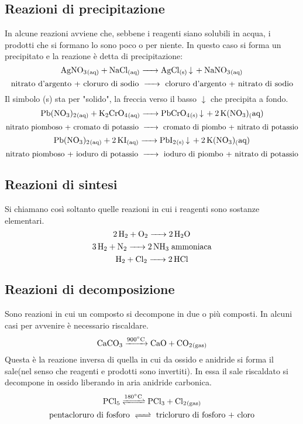 \subsection{Reazioni di precipitazione}
In alcune reazioni avviene che, sebbene i reagenti siano solubili in acqua, i prodotti che si formano lo sono poco o per niente. In questo caso si forma un precipitato e la reazione è detta di precipitazione:
$$\ce{ AgNO_3_{(aq)} + NaCl_{(aq)} -> AgCl_{(s)} v  + NaNO_3_{(aq)} }$$
$$\text{nitrato d'argento + cloruro di sodio \ce{->} cloruro d'argento + nitrato di sodio}$$
Il simbolo (s) sta per "solido", la freccia verso il basso $\downarrow$ che precipita a fondo.
$$\ce{Pb(NO_3)_2_{(aq)} + K_2CrO_4_{(aq)} ->  PbCrO_4_{(s)} v + 2 K(NO_3){_(aq)}}$$
$$\text{nitrato piomboso + cromato di potassio \ce{->} cromato di piombo + nitrato di potassio}$$
$$\ce{Pb(NO_3)_2_{(aq)} + 2 KI_{(aq)} ->  PbI_2_{(s)} v + 2 K(NO_3){_(aq)}}$$
$$\text{nitrato piomboso + ioduro di potassio \ce{->} ioduro di piombo + nitrato di potassio}$$
\subsection{Reazioni di sintesi}
Si chiamano così soltanto quelle reazioni in cui i reagenti sono sostanze elementari.
$$\ce{2 H_2 + O_2 -> 2 H_2O}$$
$$\ce{3 H_2 + N_2 -> 2 NH_3} \; \text{ammoniaca}$$
$$\ce{H_2 + Cl_2 -> 2 HCl}$$
\subsection{Reazioni di decomposizione}
Sono reazioni in cui un composto si decompone in due o più composti. In alcuni casi per avvenire è necessario riscaldare.
$$\ce{CaCO_3 ->[{900^{\circ}C}] CaO + CO_2_{(gas)} }$$
Questa è la reazione inversa di quella in cui da ossido e anidride si forma il sale(nel senso che reagenti e prodotti sono invertiti). In essa il sale riscaldato si decompone in ossido liberando in aria anidride carbonica.
$$\ce{PCl_5 <=>[{180^{\circ}C}] PCl_3 + Cl_2_{(gas)}}$$
$$\text{pentacloruro di fosforo \ce{<=>} tricloruro di fosforo + cloro}$$